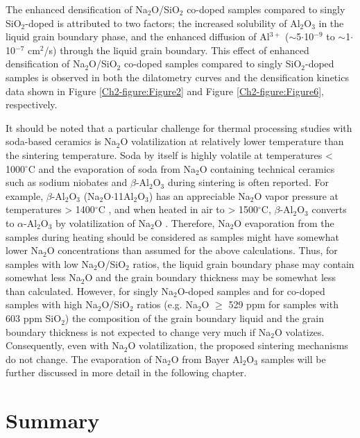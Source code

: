 The enhanced densification of Na$_{2}$O/SiO$_{2}$ co-doped samples compared to singly SiO$_{2}$-doped is attributed to two factors; the increased solubility of Al$_{2}$O$_{3}$ in the liquid grain boundary phase, and the enhanced diffusion of Al$^{3+}$ ($\sim$5$\cdot$10$^{-9}$ to $\sim$1$\cdot$10$^{-7}$ cm$^{2}$/s) through the liquid grain boundary. This effect of enhanced densification of Na$_{2}$O/SiO$_{2}$ co-doped samples compared to singly SiO$_{2}$-doped samples is observed in both the dilatometry curves and the densification kinetics data shown in Figure \ref{Ch2-figure:Figure2} and Figure \ref{Ch2-figure:Figure6}, respectively. 

It should be noted that a particular challenge for thermal processing studies with soda-based ceramics is Na$_{2}$O volatilization at relatively lower temperature than the sintering temperature. Soda by itself is highly volatile at temperatures < 1000$^{\circ}$C and the evaporation of soda from Na$_{2}$O containing technical ceramics such as sodium niobates \cite{Popovic2012} and $\beta$-Al$_{2}$O$_{3}$ during sintering is often reported. For example, $\beta$-Al$_{2}$O$_{3}$ (Na$_{2}$O$\cdot$11Al$_{2}$O$_{3}$) has an appreciable Na$_{2}$O vapor pressure at temperatures > 1400$^{\circ}$C \cite{Kummer1972a}, and when heated in air to > 1500$^{\circ}$C, $\beta$-Al$_{2}$O$_{3}$ converts to $\alpha$-Al$_{2}$O$_{3}$ by volatilization of Na$_{2}$O \cite{Kummer1972a,Gallup1935}. Therefore, Na$_{2}$O evaporation from the samples during heating should be considered as samples might have somewhat lower Na$_{2}$O concentrations than assumed for the above calculations. Thus, for samples with low Na$_{2}$O/SiO$_{2}$ ratios, the liquid grain boundary phase may contain somewhat less Na$_{2}$O and the grain boundary thickness may be somewhat less than calculated. However, for singly Na$_{2}$O-doped samples and for co-doped samples with high Na$_{2}$O/SiO$_{2}$ ratios (e.g. Na$_{2}$O $\geq$ 529 ppm for samples with 603 ppm SiO$_{2}$) the composition of the grain boundary liquid and the grain boundary thickness is not expected to change very much if Na$_{2}$O volatizes. Consequently, even with Na$_{2}$O volatilization, the proposed sintering mechanisms do not change. The evaporation of Na$_{2}$O from Bayer Al$_{2}$O$_{3}$ samples will be further discussed in more detail in the following chapter.

\section{Summary}

